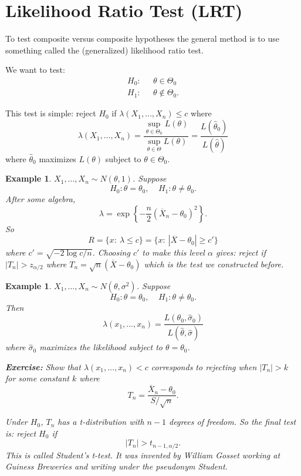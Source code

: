 \documentclass[twoside,12pt]{article}
\newtheorem{example}[theorem]{Example}
\begin{document}
\section{Likelihood Ratio Test (LRT)}
To test composite versus composite hypotheses the general method is to use something called the (generalized) likelihood ratio test. 

We want to test:
\begin{align*}
H_0: &~~~\theta \in \Theta_0 \\
H_1: &~~~\theta \notin \Theta_0.
\end{align*}

This test is simple: reject $H_0$ if
$\lambda(X_1,\ldots, X_n) \leq c$ where
$$
\lambda(X_1,\ldots, X_n) =
\frac{\sup_{\theta\in\Theta_0}L(\theta)}{\sup_{\theta\in\Theta}L(\theta)} =
\frac{L(\widehat\theta_0)}{L(\widehat\theta)}
$$
where $\widehat\theta_0$ maximizes $L(\theta)$ subject to
$\theta\in\Theta_0$.


\begin{example}
$X_1,\ldots, X_n \sim N(\theta,1)$.
Suppose
$$
H_0: \theta = \theta_0,\ \ \ \ \ 
H_1: \theta \neq \theta_0.
$$
After some algebra,
$$
\lambda = \exp\left\{ - \frac{n}{2} (\overline{X}_n - \theta_0)^2\right\}.
$$
So
$$
R =\{x:\ \lambda \leq c\} = 
\{x :\ |\overline{X}-\theta_0| \geq c'\}
$$
where
$c' = \sqrt{-2 \log c /n}$.
Choosing $c'$ to make this level $\alpha$ gives:
reject if $|T_n| > z_{\alpha/2}$ where
$T_n = \sqrt{n}(\overline{X}-\theta_0)$
which is the test we constructed before.
\end{example}



\begin{example}
$X_1,\ldots, X_n \sim N(\theta,\sigma^2)$.
Suppose
$$
H_0: \theta = \theta_0,\ \ \ \ \ 
H_1: \theta \neq \theta_0.
$$
Then
$$
\lambda(x_1,\ldots, x_n) = \frac{ L(\theta_0,\widehat\sigma_0)}{ L(\widehat\theta,\widehat\sigma)}
$$
where $\widehat\sigma_0$ maximizes the likelihood subject to
$\theta=\theta_0$.

{\bf Exercise:} Show that
$\lambda(x_1,\ldots, x_n) < c$ corresponds to rejecting when
$|T_n| > k$ for some constant $k$ where
$$
T_n = \frac{\overline{X}_n-\theta_0}{S/\sqrt{n}}.
$$

Under $H_0$, $T_n$ has a t-distribution with $n-1$ degrees of freedom.
So the final test is: reject $H_0$ if
$$
|T_n| > t_{n-1,\alpha/2}.
$$
This is called Student's t-test.
It was invented by William Gosset working at Guiness Breweries
and writing under the pseudonym Student.
\end{example}
\end{document}
